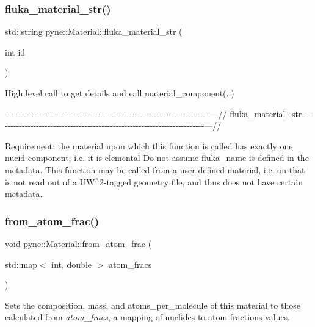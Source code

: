 \subsubsection{\texorpdfstring{fluka\+\_\+material\+\_\+str()}{fluka\_material\_str()}}
{\footnotesize\ttfamily std\+::string pyne\+::\+Material\+::fluka\+\_\+material\+\_\+str (\begin{DoxyParamCaption}\item[{int}]{id }\end{DoxyParamCaption})}



High level call to get details and call material\+\_\+component(..) 

-\/-\/-\/-\/-\/-\/-\/-\/-\/-\/-\/-\/-\/-\/-\/-\/-\/-\/-\/-\/-\/-\/-\/-\/-\/-\/-\/-\/-\/-\/-\/-\/-\/-\/-\/-\/-\/-\/-\/-\/-\/-\/-\/-\/-\/-\/-\/-\/-\/-\/-\/-\/-\/-\/-\/-\/-\/-\/-\/-\/-\/-\/-\/-\/-\/-\/-\/-\/-\/-\/-\/-\/---// fluka\+\_\+material\+\_\+str -\/-\/-\/-\/-\/-\/-\/-\/-\/-\/-\/-\/-\/-\/-\/-\/-\/-\/-\/-\/-\/-\/-\/-\/-\/-\/-\/-\/-\/-\/-\/-\/-\/-\/-\/-\/-\/-\/-\/-\/-\/-\/-\/-\/-\/-\/-\/-\/-\/-\/-\/-\/-\/-\/-\/-\/-\/-\/-\/-\/-\/-\/-\/-\/-\/-\/-\/-\/-\/-\/-\/-\/---//

Requirement\+: the material upon which this function is called has exactly one nucid component, i.\+e. it is elemental Do not assume fluka\+\_\+name is defined in the metadata. This function may be called from a user-\/defined material, i.\+e. on that is not read out of a U\+W$^\wedge$2-\/tagged geometry file, and thus does not have certain metadata. \mbox{\label{classpyne_1_1_material_a2db9572599c20eb0d17bd0993766f792}} 
\subsubsection{\texorpdfstring{from\+\_\+atom\+\_\+frac()}{from\_atom\_frac()}}
{\footnotesize\ttfamily void pyne\+::\+Material\+::from\+\_\+atom\+\_\+frac (\begin{DoxyParamCaption}\item[{std\+::map$<$ int, double $>$}]{atom\+\_\+fracs }\end{DoxyParamCaption})}

Sets the composition, mass, and atoms\+\_\+per\+\_\+molecule of this material to those calculated from {\itshape atom\+\_\+fracs}, a mapping of nuclides to atom fractions values. \mbox{\label{classpyne_1_1_material_a8f06385fde86492d1291b35fa982c753}} 
